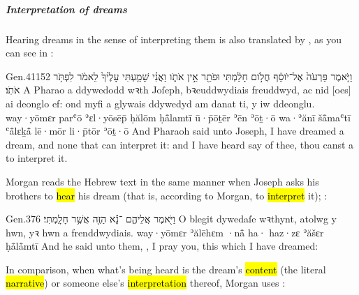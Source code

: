 \subparagraph{Interpretation of dreams}

\begin{paper}
	{\click} Hearing dreams in the sense of interpreting them is also translated by , as you can see in :
\end{paper}

\begin{example}{Gen.}{41}{15}{2}{}
	\quoling
	{וַיֹּ֤אמֶר פַּרְעֹה֙ אֶל־יֹוסֵ֔ף חֲלֹ֣ום חָלַ֔מְתִּי וּפֹתֵ֖ר אֵ֣ין אֹתֹ֑ו וַאֲנִ֗י שָׁמַ֤עְתִּי עָלֶ֙יךָ֙ לֵאמֹ֔ר   לִפְתֹּ֥ר אֹתֹֽו׃}
	{A Pharao a ddywedodd wꝛth Joſeph, bꝛeuddwydiais freuddwyd, ac nid [oes] ai deonglo ef: ond myfi a glywais ddywedyd am danat ti, y   iw ddeonglu.}
	{way·yōmɛr parʿō ʾɛl·yōsēp̄ ḥălōm ḥå̄lamtī ū·p̄ōṯēr ʾēn ʾōṯ·ō wa·ʾănī šå̄maʿtī ʿå̄lɛḵå̄ lē·mōr   li·p̄tōr ʾōṯ·ō}
	{And Pharaoh said unto Joseph, I have dreamed a dream, and  none that can interpret it: and I have heard say of thee,  thou canst  a  to interpret it.}
\end{example}

\begin{paper}
	{\click} Morgan reads the Hebrew text in the same manner when Joseph asks his brothers to \hl{hear} his dream (that is, according to Morgan, to \hl{interpret} it); :
\end{paper}

\begin{example}{Gen.}{37}{6}{}{}
	\quoling
	{וַיֹּ֖אמֶר אֲלֵיהֶ֑ם ־נָ֕א  הַזֶּ֖ה אֲשֶׁ֥ר חָלָֽמְתִּי׃}
	{O blegit dywedaſe wꝛthynt,  atolwg y  hwn, yꝛ hwn a frenddwydiais.}
	{way·yōmɛr ʾălēhɛm ·nå̄ ha· haz·zɛ ʾăšɛr ḥå̄lå̄mtī}
	{And he said unto them, , I pray you, this  which I have dreamed:}
\end{example}

\begin{paper}
	{\click} In comparison, when what’s being heard is the dream’s \hl{content} (the literal \hl{narrative}) or someone else’s \hl{interpretation} thereof, Morgan uses :
\end{paper}

